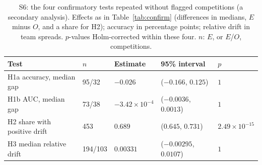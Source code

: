 \begin{table}[!t]
\centering\small
\caption{S6: the four confirmatory tests repeated without flagged competitions (a secondary analysis). Effects as in Table~\ref{tab:confirm} (differences in medians, $E$ minus $O$, and a share for H2); accuracy in percentage points; relative drift in team spreads. $p$-values Holm-corrected within these four. $n$: $E$, or $E$/$O$, competitions.}\label{tab:s6}
\begin{tabular}{lllll}
\toprule
Test & $n$ & Estimate & 95\% interval & $p$ \\
\midrule
H1a accuracy, median gap & 95/32 & $-0.026$ & ($-0.166$, $0.125$) & $1$ \\
H1b AUC, median gap & 73/38 & $-3.42\times10^{-4}$ & ($-0.0036$, $0.0013$) & $1$ \\
H2 share with positive drift & 453 & $0.689$ & ($0.645$, $0.731$) & $2.49\times10^{-15}$ \\
H3 median relative drift & 194/103 & $0.00331$ & ($-0.00295$, $0.0107$) & $1$ \\
\bottomrule
\end{tabular}
\end{table}
\FloatBarrier
